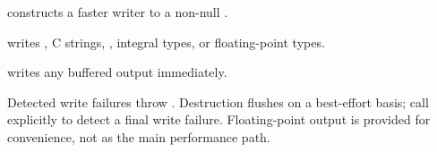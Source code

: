 \begin{compactitem}
  \item {} constructs a faster writer to a non-null .
  \item {} writes , C strings, , integral types, or floating-point types.
  \item {} writes any buffered output immediately.
\end{compactitem}

Detected write failures throw . Destruction flushes on a best-effort basis; call  explicitly to detect a final write failure. Floating-point output is provided for convenience, not as the main performance path.

